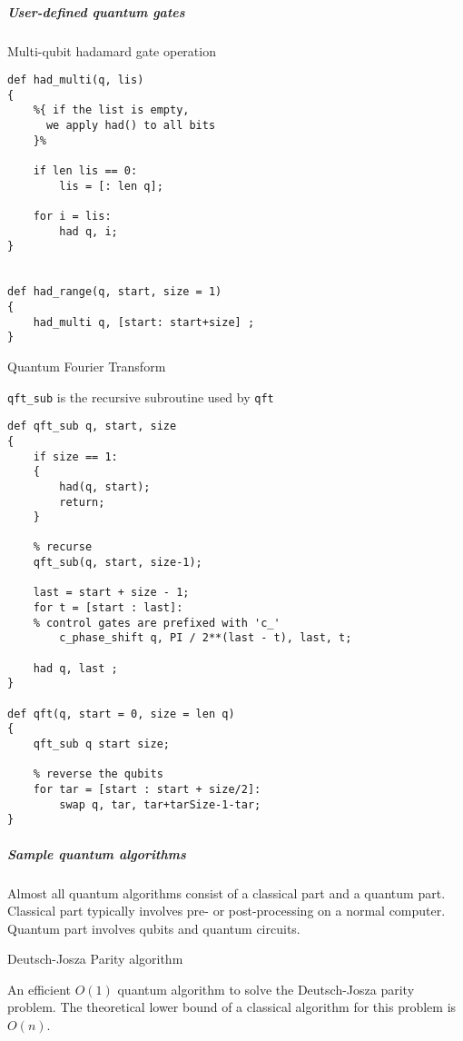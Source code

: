 \documentclass[]{article}
\begin{document}
\subparagraph{User-defined quantum
gates}\label{user-defined-quantum-gates}

Multi-qubit hadamard gate operation

\begin{verbatim}
def had_multi(q, lis)
{
    %{ if the list is empty, 
      we apply had() to all bits
    }%

    if len lis == 0:
        lis = [: len q];

    for i = lis:
        had q, i;
}


def had_range(q, start, size = 1)
{
    had_multi q, [start: start+size] ;
}
\end{verbatim}

Quantum Fourier Transform

\texttt{qft\_sub} is the recursive subroutine used by \texttt{qft}

\begin{verbatim}
def qft_sub q, start, size
{
    if size == 1:
    {
        had(q, start);
        return;
    }

    % recurse
    qft_sub(q, start, size-1);

    last = start + size - 1;
    for t = [start : last]:
    % control gates are prefixed with 'c_'
        c_phase_shift q, PI / 2**(last - t), last, t;

    had q, last ;
}

def qft(q, start = 0, size = len q)
{
    qft_sub q start size;

    % reverse the qubits
    for tar = [start : start + size/2]:
        swap q, tar, tar+tarSize-1-tar;
}
\end{verbatim}

\subparagraph{Sample quantum
algorithms}\label{sample-quantum-algorithms}

Almost all quantum algorithms consist of a classical part and a quantum
part. Classical part typically involves pre- or post-processing on a
normal computer. Quantum part involves qubits and quantum circuits.

Deutsch-Josza Parity algorithm

An efficient \(O(1)\) quantum algorithm to solve the Deutsch-Josza
parity problem. The theoretical lower bound of a classical algorithm for
this problem is \(O(n)\).
\end{document}

